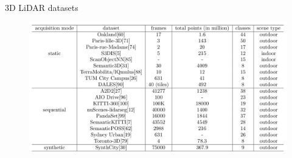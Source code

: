 \documentclass[aspectratio=169]{beamer}
\begin{document}
\begin{frame}{3D LiDAR datasets}
    \begin{figure}
        \centering
        \includegraphics[scale=0.25]{images/3d_datasets.jpg}
    \end{figure}
    \begin{table}
        \caption{3D LiDAR datasets classified based on the acquisition type. Table updated from \cite{survey3d}.}
    \end{table}
\end{frame}
\end{document}
